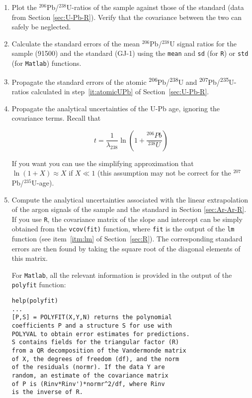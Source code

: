 \documentclass{book}
\begin{document}
\begin{enumerate}

\item Plot the $^{206}$Pb/$^{238}$U-ratios of the sample against those
  of the standard (data from Section \ref{sec:U-Pb-R}).  Verify that
  the covariance between the two can safely be neglected.

\item Calculate the standard errors of the mean $^{206}$Pb/$^{238}$U
  signal ratios for the sample (91500) and the standard (GJ-1) using
  the \texttt{mean} and \texttt{sd} (for \texttt{R}) or \texttt{std}
  (for \texttt{Matlab}) functions.

\item Propagate the standard errors of the atomic
  \textsuperscript{206}Pb/\textsuperscript{238}U and
  \textsuperscript{207}Pb/\textsuperscript{235}U-ratios calculated in
  step~\ref{it:atomicUPb} of Section~\ref{sec:U-Pb-R}.

\item Propagate the analytical uncertainties of the U-Pb age, ignoring
  the covariance terms. Recall that 

$$ t = \frac{1}{\lambda_{238}}\ln\left(1 +
  \frac{{}^{206}Pb}{{}^{238}U}\right) $$

If you want you can use the simplifying approximation that $\ln(1+X)
\approx X$ if $X \ll 1$ (this assumption may not be correct for the
$^{207}$Pb/$^{235}$U-age). \label{loglin}

\item Compute the analytical uncertainties associated with the linear
  extrapolation of the argon signals of the sample and the standard in
  Section \ref{sec:Ar-Ar-R}. If you use \texttt{R}, the covariance
  matrix of the slope and intercept can be simply obtained from the
  \texttt{vcov(fit)} function, where \texttt{fit} is the output of the
  \texttt{lm} function (see item~\ref{itm:lm} of
  Section~\ref{sec:R}). The corresponding standard errors are then
  found by taking the square root of the diagonal elements of this
  matrix.

  For \texttt{Matlab}, all the relevant information is provided in the
  output of the \texttt{polyfit} function:

\begin{verbatim}
help(polyfit)
...
[P,S] = POLYFIT(X,Y,N) returns the polynomial
coefficients P and a structure S for use with 
POLYVAL to obtain error estimates for predictions.  
S contains fields for the triangular factor (R)
from a QR decomposition of the Vandermonde matrix 
of X, the degrees of freedom (df), and the norm 
of the residuals (normr). If the data Y are 
random, an estimate of the covariance matrix 
of P is (Rinv*Rinv')*normr^2/df, where Rinv 
is the inverse of R.
\end{verbatim}


\end{enumerate}
\end{document}
